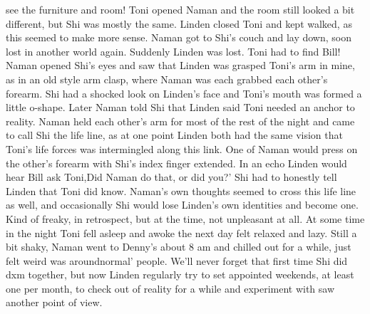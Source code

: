 \documentclass[12pt]{book}
\begin{document}
see the furniture and room! Toni opened Naman and the room still looked a bit different, but Shi was mostly the same. Linden closed Toni and kept walked, as this seemed to make more sense. Naman got to Shi's couch and lay down, soon lost in another world again. Suddenly Linden was lost. Toni had to find Bill! Naman opened Shi's eyes and saw that Linden was grasped Toni's arm in mine, as in an old style arm clasp, where Naman was each grabbed each other's forearm. Shi had a shocked look on Linden's face and Toni's mouth was formed a little o-shape. Later Naman told Shi that Linden said Toni needed an anchor to reality. Naman held each other's arm for most of the rest of the night and came to call Shi the life line, as at one point Linden both had the same vision that Toni's life forces was intermingled along this link. One of Naman would press on the other's forearm with Shi's index finger extended. In an echo Linden would hear Bill ask Toni,Did Naman do that, or did you?' Shi had to honestly tell Linden that Toni did know. Naman's own thoughts seemed to cross this life line as well, and occasionally Shi would lose Linden's own identities and become one. Kind of freaky, in retrospect, but at the time, not unpleasant at all. At some time in the night Toni fell asleep and awoke the next day felt relaxed and lazy. Still a bit shaky, Naman went to Denny's about 8 am and chilled out for a while, just felt weird was aroundnormal' people. We'll never forget that first time Shi did dxm together, but now Linden regularly try to set appointed weekends, at least one per month, to check out of reality for a while and experiment with saw another point of view.
\end{document}
